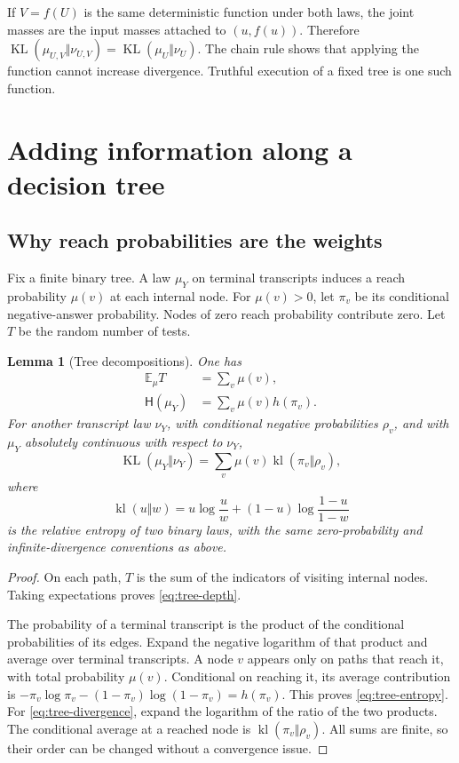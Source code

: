 \documentclass[11pt]{article}
\newtheorem{lemma}[theorem]{Lemma}
\theoremstyle{definition}
\theoremstyle{remark}
\newcommand{\E}{\mathbb E}
\newcommand{\Ent}{\mathsf H}
\newcommand{\KL}{\operatorname{KL}}
\newcommand{\kl}{\operatorname{kl}}
\numberwithin{equation}{section}
\begin{document}
If \(V=f(U)\) is the same deterministic function under both laws,
the joint masses are the input masses attached to \((u,f(u))\).
Therefore
\(\KL(\mu_{U,V}\Vert\nu_{U,V})=\KL(\mu_U\Vert\nu_U)\).
The chain rule shows that applying the function cannot increase
divergence. Truthful execution of a fixed tree is one such function.

\section{Adding information along a decision tree}\label{sec:treeinformation}

\subsection{Why reach probabilities are the weights}

Fix a finite binary tree. A law \(\mu_Y\) on terminal transcripts
induces a reach probability \(\mu(v)\) at each internal node.
For \(\mu(v)>0\), let \(\pi_v\) be its conditional negative-answer
probability. Nodes of zero reach probability contribute zero.
Let \(T\) be the random number of tests.

\begin{lemma}[Tree decompositions]\label{lem:tree}
One has
\begin{align}
 \E_\mu T&=\sum_v\mu(v),\label{eq:tree-depth}\\
 \Ent(\mu_Y)&=\sum_v\mu(v)h(\pi_v).\label{eq:tree-entropy}
\end{align}
For another transcript law \(\nu_Y\), with conditional negative
probabilities \(\rho_v\), and with \(\mu_Y\) absolutely continuous
with respect to \(\nu_Y\),
\begin{equation}\label{eq:tree-divergence}
 \KL(\mu_Y\Vert\nu_Y)=\sum_v\mu(v)\kl(\pi_v\Vert\rho_v),
\end{equation}
where
\[
 \kl(u\Vert w)=u\log\frac uw+(1-u)\log\frac{1-u}{1-w}
\]
is the relative entropy of two binary laws, with the same
zero-probability and infinite-divergence conventions as above.
\end{lemma}
\begin{proof}
On each path, \(T\) is the sum of the indicators of visiting internal
nodes. Taking expectations proves \eqref{eq:tree-depth}.

The probability of a terminal transcript is the product of the
conditional probabilities of its edges. Expand the negative logarithm
of that product and average over terminal transcripts. A node \(v\)
appears only on paths that reach it, with total probability \(\mu(v)\).
Conditional on reaching it, its average contribution is
\(-\pi_v\log\pi_v-(1-\pi_v)\log(1-\pi_v)=h(\pi_v)\).
This proves \eqref{eq:tree-entropy}.
For \eqref{eq:tree-divergence}, expand the logarithm of the ratio of
the two products. The conditional average at a reached node is
\(\kl(\pi_v\Vert\rho_v)\). All sums are finite, so their order can
be changed without a convergence issue.
\end{proof}
\end{document}
